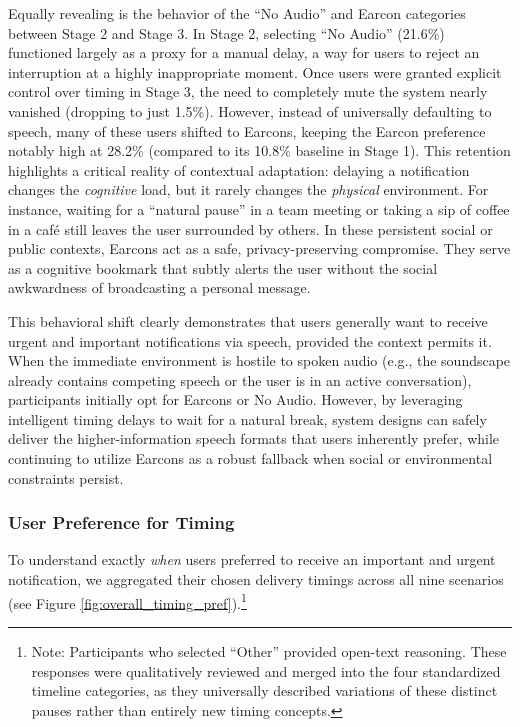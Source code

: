 Equally revealing is the behavior of the ``No Audio'' and Earcon categories between Stage 2 and Stage 3. In Stage 2, selecting ``No Audio'' (21.6\%) functioned largely as a proxy for a manual delay, a way for users to reject an interruption at a highly inappropriate moment. Once users were granted explicit control over timing in Stage 3, the need to completely mute the system nearly vanished (dropping to just 1.5\%). However, instead of universally defaulting to speech, many of these users shifted to Earcons, keeping the Earcon preference notably high at 28.2\% (compared to its 10.8\% baseline in Stage 1). This retention highlights a critical reality of contextual adaptation: delaying a notification changes the \textit{cognitive} load, but it rarely changes the \textit{physical} environment. For instance, waiting for a ``natural pause'' in a team meeting or taking a sip of coffee in a café still leaves the user surrounded by others. In these persistent social or public contexts, Earcons act as a safe, privacy-preserving compromise. They serve as a cognitive bookmark that subtly alerts the user without the social awkwardness of broadcasting a personal message.

This behavioral shift clearly demonstrates that users generally want to receive urgent and important notifications via speech, provided the context permits it. When the immediate environment is hostile to spoken audio (e.g., the soundscape already contains competing speech or the user is in an active conversation), participants initially opt for Earcons or No Audio. However, by leveraging intelligent timing delays to wait for a natural break, system designs can safely deliver the higher-information speech formats that users inherently prefer, while continuing to utilize Earcons as a robust fallback when social or environmental constraints persist.






\subsubsection{User Preference for Timing}
\label{sec:user_preference_timing}

To understand exactly \textit{when} users preferred to receive an important and urgent notification, we aggregated their chosen delivery timings across all nine scenarios (see Figure \ref{fig:overall_timing_pref}).\footnote{Note: Participants who selected ``Other'' provided open-text reasoning. These responses were qualitatively reviewed and merged into the four standardized timeline categories, as they universally described variations of these distinct pauses rather than entirely new timing concepts.} 

